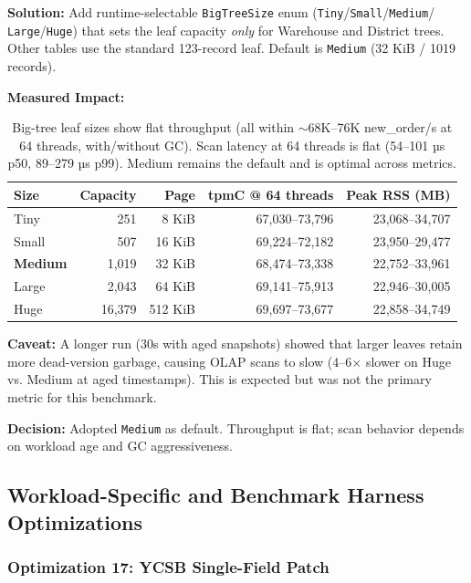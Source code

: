 \documentclass[11pt]{article}
\newcommand{\code}[1]{\texttt{#1}}
\begin{document}
\textbf{Solution:}
Add runtime-selectable \code{BigTreeSize} enum (\code{Tiny}/\code{Small}/\code{Medium}/
\code{Large}/\code{Huge}) that sets the leaf capacity \emph{only} for Warehouse and
District trees. Other tables use the standard 123-record leaf. Default is \code{Medium}
(32 KiB / 1019 records).

\textbf{Measured Impact:}

\begin{table}[h]
\centering
\small
\begin{tabular}{lrrrr}
\toprule
\textbf{Size} & \textbf{Capacity} & \textbf{Page} & \textbf{tpmC @ 64 threads} & \textbf{Peak RSS (MB)} \\
\midrule
Tiny & 251 & 8 KiB & 67,030--73,796 & 23,068--34,707 \\
Small & 507 & 16 KiB & 69,224--72,182 & 23,950--29,477 \\
\textbf{Medium} & 1,019 & 32 KiB & 68,474--73,338 & 22,752--33,961 \\
Large & 2,043 & 64 KiB & 69,141--75,913 & 22,946--30,005 \\
Huge & 16,379 & 512 KiB & 69,697--73,677 & 22,858--34,749 \\
\bottomrule
\end{tabular}
\caption{Big-tree leaf sizes show flat throughput (all within $\sim$68K--76K new\_order/s
at 64 threads, with/without GC). Scan latency at 64 threads is flat (54--101 µs p50,
89--279 µs p99). Medium remains the default and is optimal across metrics.}
\label{tab:bigtree_sizes}
\end{table}

\textbf{Caveat:} A longer run (30s with aged snapshots) showed that larger leaves
retain more dead-version garbage, causing OLAP scans to slow (4--6$\times$ slower on
Huge vs. Medium at aged timestamps). This is expected but was not the primary metric
for this benchmark.

\textbf{Decision:} Adopted \code{Medium} as default. Throughput is flat; scan behavior
depends on workload age and GC aggressiveness.

\subsection{Workload-Specific and Benchmark Harness Optimizations}
\label{sec:workload_optimizations}

\subsubsection{Optimization 17: YCSB Single-Field Patch}
\end{document}
